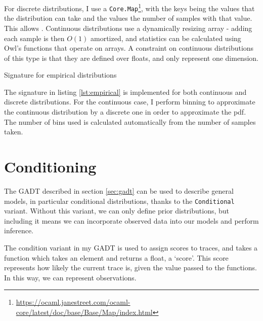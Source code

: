 For discrete distributions, I use a \texttt{Core.Map}\footnote{\url{https://ocaml.janestreet.com/ocaml-core/latest/doc/base/Base/Map/index.html}}, with the keys being the values that the distribution can take and the values the number of samples with that value. This allows . Continuous distributions use a dynamically resizing array - adding each sample is then $O(1)$ amortized, and statistics can be calculated using Owl's functions that operate on arrays. A constraint on continuous distributions of this type is that they are defined over floats, and only represent one dimension.
	
	
\begin{listing}[ht]
	\caption{Signature for empirical distributions}
	\label{lst:empirical}
\end{listing}
	
The signature in listing \ref{lst:empirical} is implemented for both continuous and discrete distributions. For the continuous case, I perform binning to approximate the continuous distribution by a discrete one in order to approximate the pdf. The number of bins used is calculated automatically from the number of samples taken.
		
\section{Conditioning} \label{sec:condition}
	
The GADT described in section \ref{sec:gadt} can be used to describe general models, in particular conditional distributions, thanks to the \texttt{Conditional} variant. Without this variant, we can only define prior distributions, but including it means we can incorporate observed data into our models and perform inference.
	
The condition variant in my GADT is used to assign scores to traces, and takes a function which takes an element and returns a float, a `score'. This score represents how likely the current trace is, given the value passed to the functions. In this way, we can represent observations.
		
